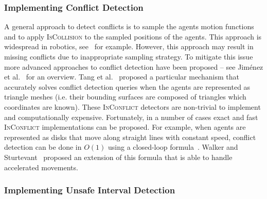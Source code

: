 \documentclass[review]{elsarticle}
\newcommand{\iscollision}{\textsc{IsCollision}\xspace}
\newcommand{\inconflict}{\textsc{InConflict}\xspace}
\newcommand{\shortcite}{\cite}
\begin{document}
\subsubsection{Implementing Conflict Detection}
A general approach to detect conflicts is to sample the agents motion functions and to apply \iscollision to the sampled positions of the agents. This approach is widespread in robotics, see~\cite{cameron1985study} for example. However, this approach may result in missing conflicts due to inappropriate sampling strategy. To mitigate this issue more advanced approaches to conflict detection have been proposed -- see Jim{\'e}nez et al.~\shortcite{jimenez20013d} for an overview. 
Tang et al.~\cite{tang2014fast} proposed a particular mechanism that accurately solves conflict detection queries when the agents are represented as triangle meshes (i.e. their bounding surfaces are composed of triangles which coordinates are known). These \inconflict detectors are non-trivial to implement and computationally expensive. Fortunately, in a number of cases exact and fast \inconflict implementations can be proposed. For example, when agents are represented as disks that move along straight lines with constant speed, conflict detection can be done in $O(1)$ using a closed-loop formula~\cite{guy2015}. 
Walker and Sturtevant~\cite{walker2019collision} proposed an extension of this formula that is able to handle accelerated movements. 




\subsubsection{Implementing Unsafe Interval Detection}
\end{document}
